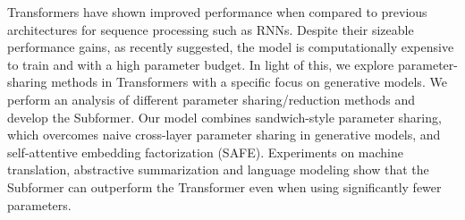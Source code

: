 Transformers have shown improved performance when compared to previous architectures for sequence processing such as RNNs. Despite their sizeable performance gains, as recently suggested, the model is computationally expensive to train and with a high parameter budget. In light of this, we explore parameter-sharing methods in Transformers with a specific focus on generative models. We perform an analysis of different parameter sharing/reduction methods and develop the Subformer. Our model combines sandwich-style parameter sharing, which overcomes naive cross-layer parameter sharing in generative models, and self-attentive embedding factorization (SAFE). Experiments on machine translation, abstractive summarization and language modeling show that the Subformer can outperform the Transformer even when using significantly fewer parameters.
